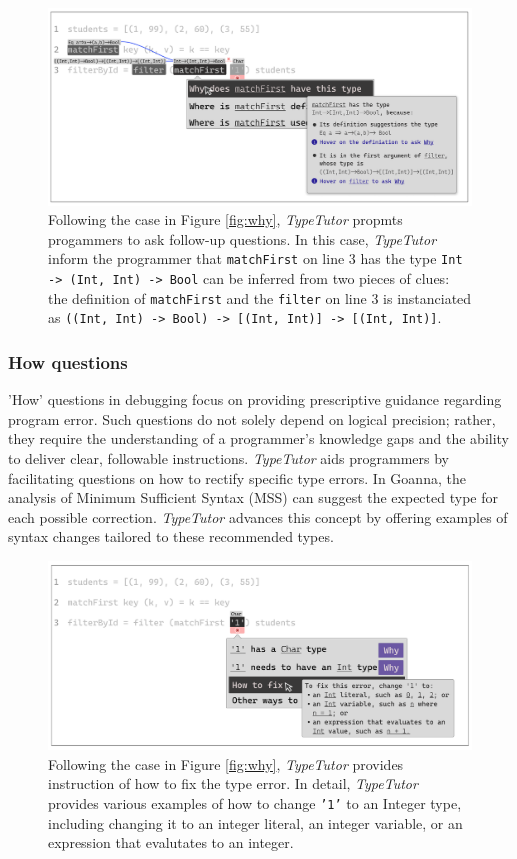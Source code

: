 \begin{figure}[hbt]
  \includegraphics[width=\linewidth]{FollowUp}
  \caption{
     Following the case in Figure \ref{fig:why}, \textit{TypeTutor} propmts progammers to ask follow-up questions. In this case, \textit{TypeTutor} inform the programmer that \texttt{matchFirst} on line 3 has the type \texttt{Int -> (Int, Int) -> Bool} can be inferred from two pieces of clues:  the definition of \texttt{matchFirst} and the \texttt{filter} on line 3 is instanciated as \texttt{((Int, Int) -> Bool) -> [(Int, Int)] -> [(Int, Int)]}.
    }
\end{figure}

\subsubsection{How questions}

'How' questions in debugging focus on providing prescriptive guidance regarding program error. Such questions do not solely depend on logical precision; rather, they require the understanding of a programmer's knowledge gaps and the ability to deliver clear, followable instructions. \textit{TypeTutor} aids programmers by facilitating questions on how to rectify specific type errors. In Goanna, the analysis of Minimum Sufficient Syntax (MSS) can suggest the expected type for each possible correction. \textit{TypeTutor} advances this concept by offering examples of syntax changes tailored to these recommended types. 



\begin{figure}[hbt]
  \includegraphics[width=\linewidth]{How}
  \caption{
    Following the case in Figure \ref{fig:why}, \textit{TypeTutor} provides instruction of how to fix the type error. In detail,  \textit{TypeTutor} provides various examples of how to change \texttt{'1'} to an Integer type, including changing it to an integer literal, an integer variable, or an expression that evalutates to an integer.
    }
\end{figure}

